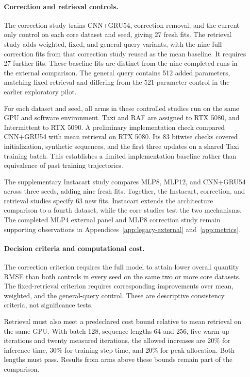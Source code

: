 \documentclass[runningheads]{llncs}
\begin{document}
\paragraph{Correction and retrieval controls.}
The correction study trains CNN+GRU54, correction removal, and the current-only control on each core dataset and seed, giving 27 fresh fits. The retrieval study adds weighted, fixed, and general-query variants, with the nine full-correction fits from that correction study reused as the mean baseline. It requires 27 further fits. These baseline fits are distinct from the nine completed runs in the external comparison. The general query contains 512 added parameters, matching fixed retrieval and differing from the 521-parameter control in the earlier exploratory pilot.

For each dataset and seed, all arms in these controlled studies run on the same GPU and software environment. Taxi and RAF are assigned to RTX 5080, and Intermittent to RTX 5090. A preliminary implementation check compared CNN+GRU54 with mean retrieval on RTX 5080. Its 83 bitwise checks covered initialization, synthetic sequences, and the first three updates on a shared Taxi training batch. This establishes a limited implementation baseline rather than equivalence of past training trajectories.

The supplementary Instacart study compares MLP8, MLP12, and CNN+GRU54 across three seeds, adding nine fresh fits. Together, the Instacart, correction, and retrieval studies specify 63 new fits. Instacart extends the architecture comparison to a fourth dataset, while the core studies test the two mechanisms. The completed MLP4 external panel and MLP8 correction study remain supporting observations in Appendices~\ref{app:legacy-external} and~\ref{app:metrics}.

\paragraph{Decision criteria and computational cost.}
The correction criterion requires the full model to attain lower overall quantity RMSE than both controls in every seed on the same two or more core datasets. The fixed-retrieval criterion requires corresponding improvements over mean, weighted, and the general-query control. These are descriptive consistency criteria, not significance tests.

Retrieval must also meet a predeclared cost bound relative to mean retrieval on the same GPU. With batch 128, sequence lengths 64 and 256, five warm-up iterations and twenty measured iterations, the allowed increases are 20\% for inference time, 30\% for training-step time, and 20\% for peak allocation. Both lengths must pass. Results from arms above these bounds remain part of the comparison.
\end{document}
